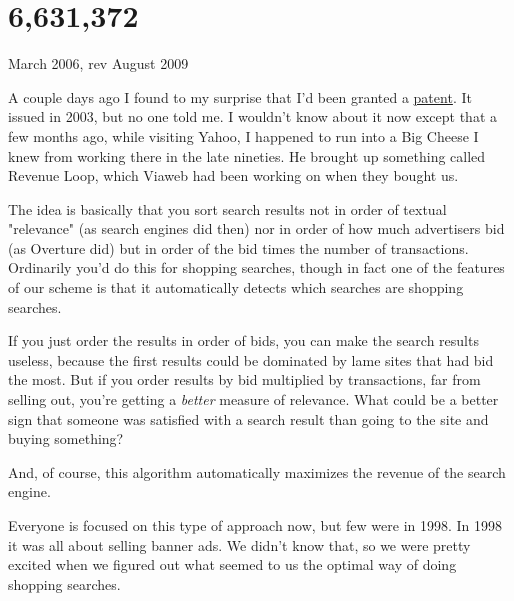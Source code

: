 \chapter{6,631,372}


            
              
                

March 2006, rev August 2009

A couple days ago I
                  found to my surprise that I'd been granted a
                  \href{http://patft.uspto.gov/netacgi/nph-Parser?Sect1=PTO1\&Sect2=HITOFF\&d=PALL\&p=1\&u=\%2Fnetahtml\%2FPTO\%2Fsrchnum.htm\&r=1\&f=G\&l=50\&s1=6,631,372.PN.\&OS=PN/6,631,372\&RS=PN/6,631,372}{patent}. It issued in 2003, but no one told me. I wouldn't know
                  about it now except that a few months ago, while visiting
                  Yahoo, I happened to run into a Big Cheese I knew from working
                  there in the late nineties. He brought up something called
                  Revenue Loop, which Viaweb had been working on when they
                  bought us.

The idea is basically that you sort
                  search results not in order of textual "relevance" (as search
                  engines did then) nor in order of how much advertisers bid (as
                  Overture did) but in order of the bid times the number of
                  transactions. Ordinarily you'd do this for shopping searches,
                  though in fact one of the features of our scheme is that it
                  automatically detects which searches are shopping searches.

If
                  you just order the results in order of bids, you can make the
                  search results useless, because the first results could be
                  dominated by lame sites that had bid the most. But if you
                  order results by bid multiplied by transactions, far from
                  selling out, you're getting a \emph{better} measure of
                  relevance. What could be a better sign that someone was
                  satisfied with a search result than going to the site and
                  buying something?

And, of course, this algorithm
                  automatically maximizes the revenue of the search engine.

Everyone
                  is focused on this type of approach now, but few were in 1998.
                  In 1998 it was all about selling banner ads. We didn't know
                  that, so we were pretty excited when we figured out what
                  seemed to us the optimal way of doing shopping searches.

